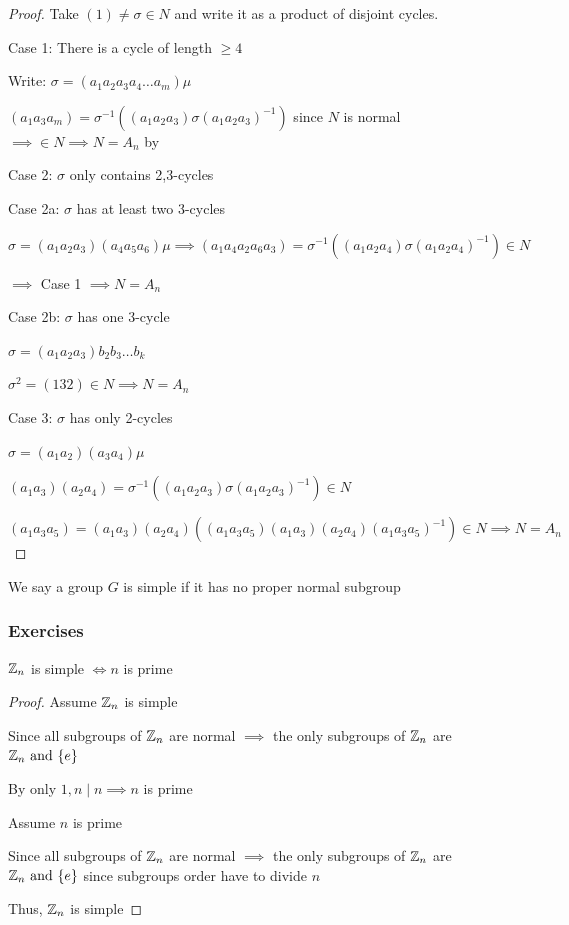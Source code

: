 \begin{proof}
    Take $(1)\neq \sigma \in N$ and write it as a product of 
    disjoint cycles.

    Case 1: There is a cycle of length $\geq 4$

    Write: $\sigma=(a_1a_2a_3a_4\dots a_m)\mu$

    $(a_1a_3a_m)=\sigma^{-1}((a_1a_2a_3)\sigma(a_1a_2a_3)^{-1})$ 
    since $N$ is normal 
    $\implies \in N \implies N = A_n$ by 

    Case 2: $\sigma$ only contains 2,3-cycles

    Case 2a: $\sigma$ has at least two 3-cycles
    
    $\sigma=(a_1a_2a_3)(a_4a_5a_6)\mu 
    \implies (a_1a_4a_2a_6a_3)=\sigma^{-1}((a_1a_2a_4)\sigma(a_1a_2a_4)^{-1})\in N$

    $\implies$ Case 1 $\implies N = A_n$

    Case 2b: $\sigma$ has one 3-cycle

    $\sigma=(a_1a_2a_3)b_2b_3\dots b_k$

    $\sigma^2=(132) \in N \implies N=A_n$

    Case 3: $\sigma$ has only 2-cycles

    $\sigma=(a_1a_2)(a_3a_4)\mu$

    $(a_1a_3)(a_2a_4)=\sigma^{-1}((a_1a_2a_3)\sigma(a_1a_2a_3)^{-1}) \in N$

    $(a_1a_3a_5)=(a_1a_3)(a_2a_4)((a_1a_3a_5)(a_1a_3)(a_2a_4)(a_1a_3a_5)^{-1}) \in N
    \implies N = A_n$

\end{proof}

\begin{definition}
    We say a group $G$ is simple if it has no proper normal subgroup
\end{definition}

\newpage
\subsubsection{Exercises}
\begin{example}
    $\mathbb{Z}_n$ is simple $\iff n$ is prime
    \begin{proof}
        Assume $\mathbb{Z}_n$ is simple

        Since all subgroups of $\mathbb{Z}_n$ are normal $\implies$ the only subgroups
        of $\mathbb{Z}_n$ are $\mathbb{Z}_n \text{ and } \{e\}$

        By  only $1,n \mid n \implies n$ is prime

        Assume $n$ is prime

        Since all subgroups of $\mathbb{Z}_n$ are normal $\implies$ the only subgroups
        of $\mathbb{Z}_n$ are $\mathbb{Z}_n \text{ and } \{e\}$ since subgroups order have to divide $n$

        Thus, $\mathbb{Z}_n$ is simple
    \end{proof}
\end{example}